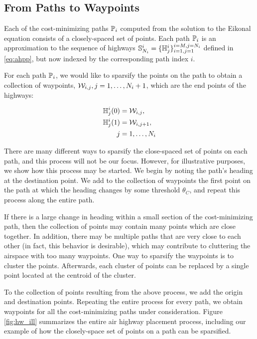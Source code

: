 \subsection{From Paths to Waypoints}
Each of the cost-minimizing paths $\mathbb{P}_i$ computed from the solution to the Eikonal equation consists of a closely-spaced set of points. Each path $\mathbb{P}_i$ is an approximation to the sequence of highways $\mathbb{S}_{N_i}^i = \{\mathbb{H}^i_j\}_{i=1,j=1}^{i=M,j=N_i}$ defined in \eqref{eq:ahpp}, but now indexed by the corresponding path index $i$. 

For each path $\mathbb{P}_i$, we would like to sparsify the points on the path to obtain a collection of waypoints, $\mathcal{W}_{i,j}, j = 1,\ldots, N_i+1$, which are the end points of the highways:

\begin{equation}
\begin{aligned}
\mathbb{H}^i_j(0) &= \mathcal{W}_{i,j}, \\
\mathbb{H}^i_j(1) &= \mathcal{W}_{i,j+1}, \\
j &= 1,\ldots,N_i
\end{aligned}
\end{equation}

There are many different ways to sparsify the close-spaced set of points on each path, and this process will not be our focus. However, for illustrative purposes, we show how this process may be started. We begin by noting the path's heading at the destination point. We add to the collection of waypoints the first point on the path at which the heading changes by some threshold $\theta_C$, and repeat this process along the entire path.

If there is a large change in heading within a small section of the cost-minimizing path, then the collection of points may contain many points which are close together. In addition, there may be multiple paths that are very close to each other (in fact, this behavior is desirable), which may contribute to cluttering the airspace with too many waypoints. One way to sparsify the waypoints is to cluster the points. Afterwards, each cluster of points can be replaced by a single point located at the centroid of the cluster. 

To the collection of points resulting from the above process, we add the origin and destination points. Repeating the entire process for every path, we obtain waypoints for all the cost-minimizing paths under consideration. Figure \ref{fig:hw_ill} summarizes the entire air highway placement process, including our example of how the closely-space set of points on a path can be sparsified.